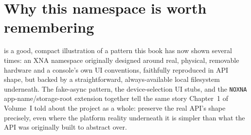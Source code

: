 \section{Why this namespace is worth remembering}

 is a good, compact illustration of a pattern this book has now shown several
times: an XNA namespace originally designed around real, physical, removable hardware and a
console's own UI conventions, faithfully reproduced in API shape, but backed by a
straightforward, always-available local filesystem underneath. The fake-async pattern, the
device-selection UI stubs, and the \texttt{NOXNA} app-name/storage-root extension together
tell the same story Chapter~1 of Volume~I told about the project as a whole: preserve the
real API's shape precisely, even where the platform reality underneath it is simpler than
what the API was originally built to abstract over.
